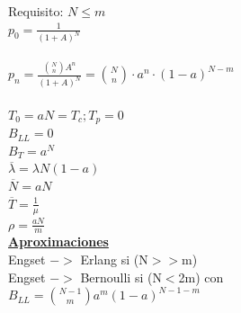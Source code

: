\begin{minipage}{.22\textwidth}
	Requisito: $N\le{m}$ \\
	$p_0=\frac{1}{(1+A)^N}$ \\ \\
	$p_n=\frac{\binom{N}{n}{A^n}}{(1+A)^N}=\binom{N}{n}\cdot{a^n}\cdot{(1-a)^{N-m}}$ \\ \\
	$T_0=aN=T_c;T_p=0$ \\
	$B_{LL}=0$ \\
	$B_{T}=a^N$ \\
	$\overline{\lambda}=\lambda{N}{(1-a)}$ \\
	$\overline{N}=a{N}$ \\
	$\overline{T}=\frac{1}{\mu}$ \\
	$\rho=\frac{aN}{m}$ \\
	{\bf \underline{Aproximaciones}} \\
	Engset $->$ Erlang si (N$>>$m) \\
	Engset $->$ Bernoulli si (N$<$2m) con \\
	$B_{LL}=\binom{N-1}{m}{a^m}{(1-a)^{N-1-m}}$ \\
\end{minipage}

